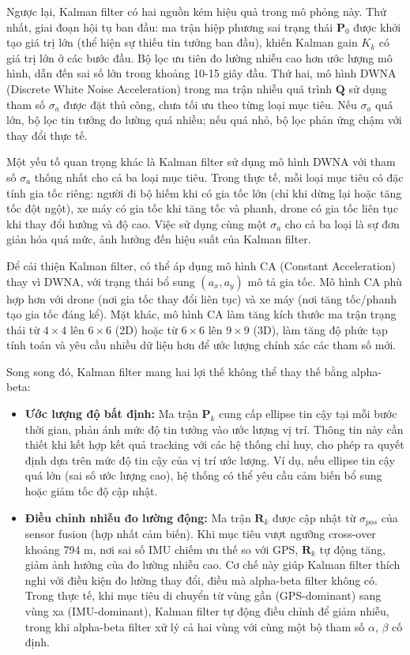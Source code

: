 Ngược lại, Kalman filter có hai nguồn kém hiệu quả trong mô phỏng này. Thứ nhất, giai đoạn hội tụ ban đầu: ma trận hiệp phương sai trạng thái $\mathbf{P}_0$ được khởi tạo giá trị lớn (thể hiện sự thiếu tin tưởng ban đầu), khiến Kalman gain $K_k$ có giá trị lớn ở các bước đầu. Bộ lọc ưu tiên đo lường nhiễu cao hơn ước lượng mô hình, dẫn đến sai số lớn trong khoảng 10-15 giây đầu. Thứ hai, mô hình DWNA (Discrete White Noise Acceleration) trong ma trận nhiễu quá trình $\mathbf{Q}$ sử dụng tham số $\sigma_a$ được đặt thủ công, chưa tối ưu theo từng loại mục tiêu. Nếu $\sigma_a$ quá lớn, bộ lọc tin tưởng đo lường quá nhiều; nếu quá nhỏ, bộ lọc phản ứng chậm với thay đổi thực tế.

Một yếu tố quan trọng khác là Kalman filter sử dụng mô hình DWNA với tham số $\sigma_a$ thống nhất cho cả ba loại mục tiêu. Trong thực tế, mỗi loại mục tiêu có đặc tính gia tốc riêng: người đi bộ hiếm khi có gia tốc lớn (chỉ khi dừng lại hoặc tăng tốc đột ngột), xe máy có gia tốc khi tăng tốc và phanh, drone có gia tốc liên tục khi thay đổi hướng và độ cao. Việc sử dụng cùng một $\sigma_a$ cho cả ba loại là sự đơn giản hóa quá mức, ảnh hưởng đến hiệu suất của Kalman filter.

Để cải thiện Kalman filter, có thể áp dụng mô hình CA (Constant Acceleration) thay vì DWNA, với trạng thái bổ sung $(a_x, a_y)$ mô tả gia tốc. Mô hình CA phù hợp hơn với drone (nơi gia tốc thay đổi liên tục) và xe máy (nơi tăng tốc/phanh tạo gia tốc đáng kể). Mặt khác, mô hình CA làm tăng kích thước ma trận trạng thái từ $4 \times 4$ lên $6 \times 6$ (2D) hoặc từ $6 \times 6$ lên $9 \times 9$ (3D), làm tăng độ phức tạp tính toán và yêu cầu nhiều dữ liệu hơn để ước lượng chính xác các tham số mới.

Song song đó, Kalman filter mang hai lợi thế không thể thay thế bằng alpha-beta:

\begin{itemize}
    \item \textbf{Ước lượng độ bất định:} Ma trận $\mathbf{P}_k$ cung cấp ellipse tin cậy tại mỗi bước thời gian, phản ánh mức độ tin tưởng vào ước lượng vị trí. Thông tin này cần thiết khi kết hợp kết quả tracking với các hệ thống chỉ huy, cho phép ra quyết định dựa trên mức độ tin cậy của vị trí ước lượng. Ví dụ, nếu ellipse tin cậy quá lớn (sai số ước lượng cao), hệ thống có thể yêu cầu cảm biến bổ sung hoặc giảm tốc độ cập nhật.

    \item \textbf{Điều chỉnh nhiễu đo lường động:} Ma trận $\mathbf{R}_k$ được cập nhật từ $\sigma_{pos}$ của sensor fusion (hợp nhất cảm biến). Khi mục tiêu vượt ngưỡng cross-over khoảng 794 m, nơi sai số IMU chiếm ưu thế so với GPS, $\mathbf{R}_k$ tự động tăng, giảm ảnh hưởng của đo lường nhiễu cao. Cơ chế này giúp Kalman filter thích nghi với điều kiện đo lường thay đổi, điều mà alpha-beta filter không có. Trong thực tế, khi mục tiêu di chuyển từ vùng gần (GPS-dominant) sang vùng xa (IMU-dominant), Kalman filter tự động điều chỉnh để giảm nhiễu, trong khi alpha-beta filter xử lý cả hai vùng với cùng một bộ tham số $\alpha$, $\beta$ cố định.
\end{itemize}

